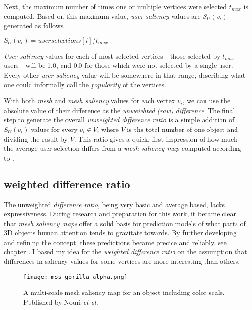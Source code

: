 Next, the maximum number of times one or multiple vertices were selected $t_{max}$ is computed. Based on this maximum value, \textit{user saliency} values are $S_{U}(v_i)$ generated as follows.

$S_{U}(v_i) = userselections[i]/t_{max}$

\textit{User saliency} values for each of most selected vertices - those selected by $t_{max}$ users - will be 1.0, and 0.0 for those which were not selected by a single user. Every other \textit{user saliency} value will be somewhere in that range, describing what one could informally call the \textit{popularity} of the vertices.

With both \textit{mesh} and \textit{mesh saliency} values for each vertex $v_i$, we can use the absolute value of their difference as the \textit{unweighted (raw) difference}. The final step to generate the overall \textit{unweighted difference ratio} is a simple addition of $S_{U}(v_i)$ values for every $v_i \in V$, where $V$ is the total number of one object and dividing the result by $V$. This ratio gives a quick, first impression of how much the average user selection differs from a \textit{mesh saliency map} computed according to \cite{lee2005mesh}.

		\subsection{weighted difference ratio}
		\label{sec:weighted_difference_ratio}
The unweighted \textit{difference ratio}, being very basic and average based, lacks expressiveness. During research and preparation for this work, it became clear that \textit{mesh saliency maps} offer a solid basis for prediction models of what parts of 3D objects human attention tends to gravitate towards. By further developing and refining the concept, these predictions became precice and reliably, see chapter \cite{sec:related_work}. I based my idea for the \textit{weighted difference ratio} on the assumption that differences in saliency values for some vertices are more interesting than others.

\begin{figure}[htb]
  \centering
  \texttt{[image: mss\_gorilla\_alpha.png]}\\ %
  \caption{A multi-scale mesh saliency map for an object including color scale. Published by Nouri \textit{et al.} \cite{nouri2015multi}}\label{fig:gorilla_saliency_map}
\end{figure}

